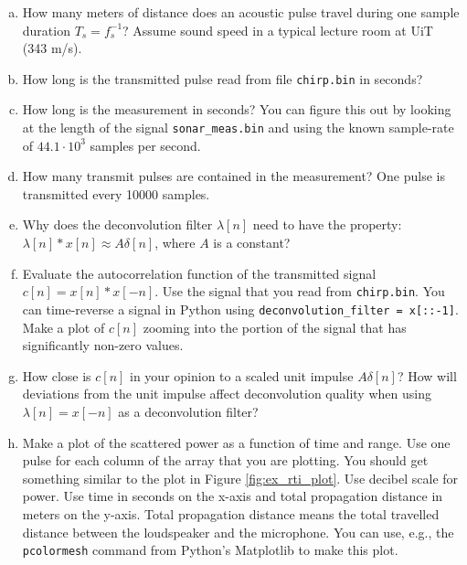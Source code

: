 \begin{enumerate}[a)]
\item How many meters of distance does an acoustic pulse travel during one sample duration $T_s = f_s^{-1}$? Assume sound speed in a typical lecture room at UiT (343 m/s).

  \item How long is the transmitted pulse read from file \verb|chirp.bin| in seconds?  

  \item How long is the measurement in seconds? You can figure this out by looking at the length of the signal \verb|sonar_meas.bin| and using the known sample-rate of $44.1 \cdot 10^3$ samples per second.
    
  \item How many transmit pulses are contained in the measurement? One
    pulse is transmitted every 10000 samples.
    
 \item Why does the deconvolution filter $\lambda[n]$ need to have the
  property: $\lambda[n]*x[n] \approx A\delta[n]$, where $A$ is a
  constant?
   
 \item Evaluate the autocorrelation function of the transmitted signal
   $c[n]=x[n]*x[-n]$. Use the signal that you read from
   \verb|chirp.bin|. You can time-reverse a signal in Python using
   \verb|deconvolution_filter = x[::-1]|. Make a plot of $c[n]$
   zooming into the portion of the signal that has significantly
   non-zero values.

 \item How close is $c[n]$ in your opinion to a scaled unit
   impulse $A\delta[n]$? How will deviations from the unit impulse
   affect deconvolution quality when using $\lambda[n]=x[-n]$ as a
   deconvolution filter?

 \item Make a plot of the scattered power as a function of time and
   range. Use one pulse for each column of the array that you are
   plotting.  You should get something similar to the plot in Figure
   \ref{fig:ex_rti_plot}. Use decibel scale for power. Use time in
   seconds on the x-axis and total propagation distance in meters on
   the y-axis. Total propagation distance means the total travelled
   distance between the loudspeaker and the microphone. You can use,
   e.g., the \verb|pcolormesh| command from Python's Matplotlib to
   make this plot.


\end{enumerate}
